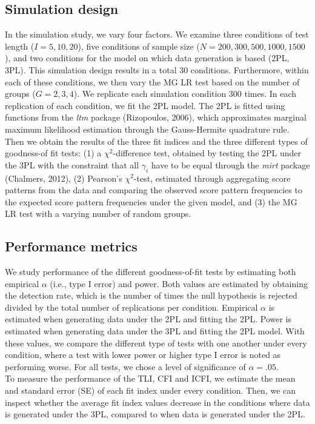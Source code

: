 \documentclass[Royal,sageapa,times,doublespace]{sagej}
\begin{document}
\subsection{Simulation design}
In the simulation study, we vary four factors. We examine three conditions of test length ($I = 5, 10, 20$), five conditions of sample size ($N = 200, 300, 500, 1000, 1500$), and two conditions for the model on which data generation is based (2PL, 3PL). This simulation design results in a total 30 conditions. Furthermore, within each of these conditions, we then vary the MG LR test based on the number of groups ($G = 2, 3, 4$). We replicate each simulation condition 300 times. In each replication of each condition, we fit the 2PL model. The 2PL is fitted using functions from the \textit{ltm} package (Rizopoulos, 2006), which approximates marginal maximum likelihood estimation through the Gauss-Hermite quadrature rule. Then we obtain the results of the three fit indices and the three different types of goodness-of fit tests: (1) a $\chi^2$-difference test, obtained by testing the 2PL under the 3PL with the constraint that all $\gamma_i$ have to be equal through the \textit{mirt} package (Chalmers, 2012), (2) Pearson's $\chi^2$-test, estimated through aggregating score patterns from the data and comparing the observed score pattern frequencies to the expected score pattern frequencies under the given model, and (3) the MG LR test with a varying number of random groups. 
\subsection{Performance metrics}
We study performance of the different goodness-of-fit tests by estimating both empirical $\alpha$ (i.e., type I error) and power. Both values are estimated by obtaining the detection rate, which is the number of times the null hypothesis is rejected divided by the total number of replications per condition. Empirical $\alpha$ is estimated when generating data under the 2PL and fitting the 2PL. Power is estimated when generating data under the 3PL and fitting the 2PL model. With these values, we compare the different type of tests with one another under every condition, where a test with lower power or higher type I error is noted as performing worse. For all tests, we chose a level of significance of $\alpha = .05$. \\
\indent To measure the performance of the TLI, CFI and ICFI, we estimate the mean and standard error (SE) of each fit index under every condition. Then, we can inspect whether the average fit index values decrease in the conditions where data is generated under the 3PL, compared to when data is generated under the 2PL. 
\end{document}
